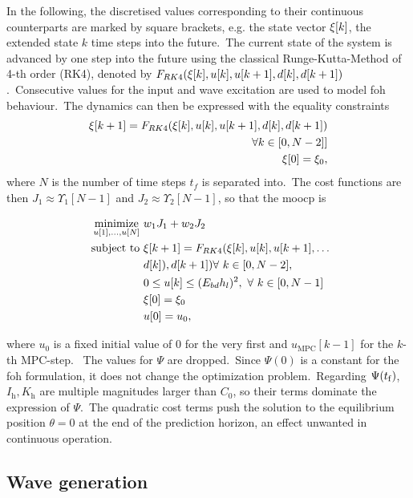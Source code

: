 In the following, the discretised values corresponding to their continuous counterparts are marked by square brackets, e.g. the state vector $\xi[k]$, the extended state $k$ time steps into the future.\ 
The current state of the system is advanced by one step into the future using the classical Runge-Kutta-Method of 4-th order (RK4), denoted by $F_{RK4}(\xi[k], u[k], u[k+1], d[k], d[k+1])$.\ 
Consecutive values for the input and wave excitation are used to model \ac{foh} behaviour.\ 
The dynamics can then be expressed with the equality constraints
\begin{align*}
	\xi[k+1] = F_{RK4}(\xi[k], u[k], u[k+1], d[k], d[k+1]) \\
	\forall k\in\left[0,N-2]\right]\\
	\xi[0] = \xi_0,
\end{align*}
where $N$ is the number of time steps $t_f$ is separated into.\ 
The cost functions are then $J_1 \approx \Upsilon_1[N-1]$ and $J_2 \approx \Upsilon_2[N-1]$, so that the \ac{moocp} is
\begin{problem}\label{pb:problem_disc}
	\begin{align}\label{eq:problem2}
		\operatorname*{minimize}_{u[1],\ldots,u[N]} \ &w_1 J_1 + w_2 J_2 \nonumber\\
		\ \text{subject to} \ & \xi[k+1] = F_{RK4}(\xi[k], u[k], u[k+1],\dots\nonumber\\ &d[k]), d[k+1])  \forall \ k \in [0, N-2], \nonumber\\
		&0 \le  u[k] \le (E_{bd} h_l)^2, \ \forall \ k \in [0, N-1]\\
		& \xi[0] = \xi_0\\
		& u[0] = u_0,
	\end{align}
\end{problem}
where $u_0$ is a fixed initial value of 0 for the very first and $u_\mathrm{MPC}[k-1]$ for the $k$-th MPC-step. \
The values for $\Psi$ are dropped.\ 
Since $\Psi(0)$ is a constant for the \ac{foh} formulation, it does not change the optimization problem.\ 
Regarding $\Psi(t_\mathrm{f})$, $I_\mathrm{h}, K_\mathrm{h}$ are multiple magnitudes larger than $C_0$, so their terms dominate the expression of $\Psi$.\ 
The quadratic cost terms push the solution to the equilibrium position $\theta = 0$ at the end of the prediction horizon, an effect unwanted in continuous operation.

\subsection{Wave generation}
\begin{figure}[htb]
	\centering
	\fontsize{8}{0}\selectfont
	\def\svgwidth{0.49\textwidth}
	
	\caption{}
	\label{}
\end{figure}

